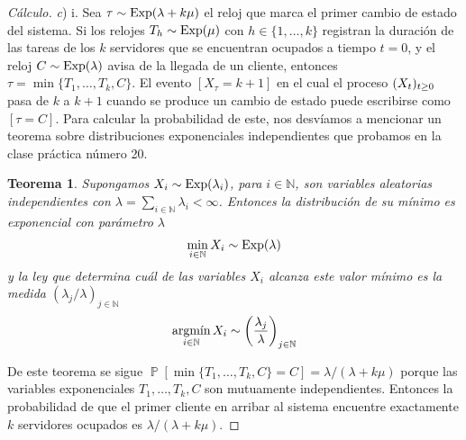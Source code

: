 \documentclass{article}
\DeclareMathOperator{\prob}{\mathbb{P}}
\DeclareMathOperator{\Exponential}{\textnormal{Exp}}
\DeclareMathOperator*{\argmin}{\textnormal{argmín}}
\newcommand{\naturalnum}{\mathbb{N}}
\newtheorem{theorem}{Teorema}
\theoremstyle{definition}
\begin{document}
\begin{proof}[Cálculo] \textit{c}) i.
Sea \(\tau \sim \Exponential(\lambda + k \mu)\) el reloj que marca el primer cambio de estado del sistema.
Si los relojes \(T_h \sim \Exponential(\mu)\) con \(h \in \{1, \dots, k\}\) registran la duración de las tareas de los \(k\) servidores que se encuentran ocupados a tiempo \(t = 0\), y el reloj \(C \sim \Exponential(\lambda)\) avisa de la llegada de un cliente, entonces \(\tau = \min \{T_1, \dots, T_k, C\}\).
El evento \([X_{\tau} = k + 1]\) en el cual el proceso \((X_t)_{t \geq 0}\) pasa de \(k\) a \(k + 1\) cuando se produce un cambio de estado puede escribirse como \([\tau = C]\).
Para calcular la probabilidad de este, nos desvíamos a mencionar un teorema sobre distribuciones exponenciales independientes que probamos en la clase práctica número 20.

\begingroup
\newcommand{\exponentialVariable}{X}
\newcommand{\exponentialParameter}{\lambda}
\begin{theorem}
Supongamos \(\exponentialVariable_i \sim \Exponential(\exponentialParameter_i)\), para \(i \in \naturalnum\), son variables aleatorias independientes con \(\exponentialParameter = \sum_{i \in \naturalnum} \exponentialParameter_i < \infty\).
Entonces la distribución de su mínimo es exponencial con parámetro \(\exponentialParameter\)
\begin{align}
	\min_{i \in \naturalnum} \exponentialVariable_i \sim \Exponential(\exponentialParameter)
\end{align}
y la ley que determina cuál de las variables \(X_i\) alcanza este valor mínimo es la medida \((\exponentialParameter_j / \exponentialParameter)_{j \in \naturalnum}\)
\begin{align}
	\argmin_{i \in \naturalnum} X_i \sim \left( \frac{\exponentialParameter_j}{\exponentialParameter} \right)_{j \in \naturalnum}
\end{align}
\end{theorem}
\endgroup
De este teorema se sigue \(\prob[\min \{T_1, \dots, T_k, C\} = C] = \lambda / (\lambda + k \mu)\) porque las variables exponenciales \(T_1, \dots, T_k, C\) son mutuamente independientes.
Entonces la probabilidad de que el primer cliente en arribar al sistema encuentre exactamente \(k\) servidores ocupados es \(\lambda / (\lambda + k \mu)\).
\end{proof}
\end{document}
